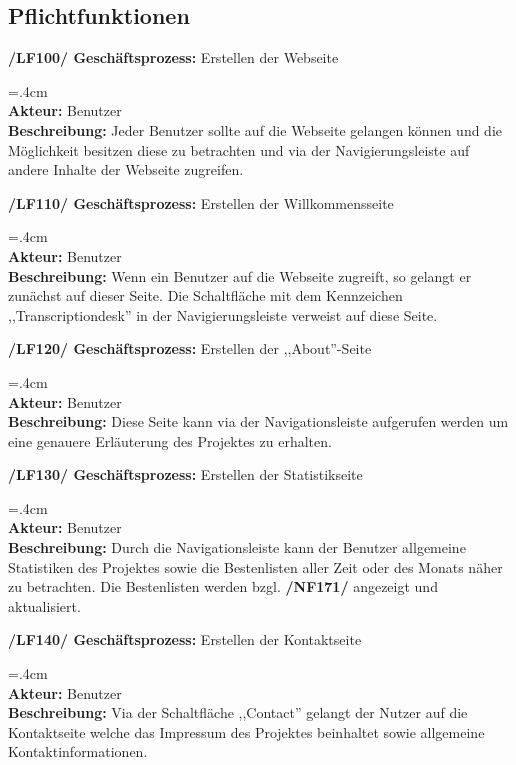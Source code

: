 \documentclass{article}
\newenvironment{funcD}{\vspace{-.6cm}\\\par\begingroup\leftskip=.4cm\noindent\\}{\\\par\endgroup\noindent}
\begin{document}
\subsection{Pflichtfunktionen}
\textbf{/LF100/ Geschäftsprozess:} Erstellen der Webseite
\begin{funcD}
    \textbf{Akteur:} Benutzer \vspace{.1cm}\\
    \textbf{Beschreibung:} Jeder Benutzer sollte auf die Webseite gelangen können und die Möglichkeit besitzen diese zu betrachten und via der Navigierungsleiste auf andere Inhalte der Webseite zugreifen.   
\end{funcD}
\textbf{/LF110/ Geschäftsprozess:} Erstellen der Willkommensseite
\begin{funcD}
    \textbf{Akteur:} Benutzer\vspace{.1cm}\\
    \textbf{Beschreibung:} Wenn ein Benutzer auf die Webseite zugreift, so gelangt er zunächst auf dieser Seite. Die Schaltfläche mit dem Kennzeichen ,,Transcriptiondesk'' in der Navigierungsleiste verweist auf diese Seite.
\end{funcD}
\textbf{/LF120/ Geschäftsprozess:} Erstellen der ,,About''-Seite
\begin{funcD}
    \textbf{Akteur:} Benutzer\vspace{.1cm}\\
    \textbf{Beschreibung:} Diese Seite kann via der Navigationsleiste aufgerufen werden um eine genauere Erläuterung des Projektes zu erhalten.
\end{funcD}
\textbf{/LF130/ Geschäftsprozess:} Erstellen der Statistikseite
\begin{funcD}
    \textbf{Akteur:} Benutzer\vspace{.1cm}\\
    \textbf{Beschreibung:} Durch die Navigationsleiste kann der Benutzer allgemeine Statistiken des Projektes sowie die Bestenlisten aller Zeit oder des Monats näher zu betrachten. Die Bestenlisten werden bzgl. \textbf{/NF171/} angezeigt und aktualisiert.
\end{funcD}
\textbf{/LF140/ Geschäftsprozess:} Erstellen der Kontaktseite
\begin{funcD}
    \textbf{Akteur:} Benutzer\vspace{.1cm}\\
    \textbf{Beschreibung:} Via der Schaltfläche ,,Contact'' gelangt der Nutzer auf die Kontaktseite welche das Impressum des Projektes beinhaltet sowie allgemeine Kontaktinformationen.
\end{funcD}
\end{document}
